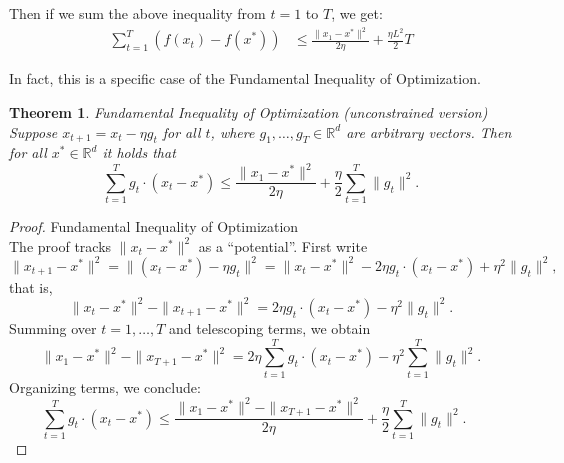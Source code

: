 \documentclass[11pt]{book} %
\newtheorem{theorem}{Theorem}[section]
\begin{document}
Then if we sum the above inequality from $t=1$ to $T$, we get:
\begin{align*}
    \sum_{t=1}^T ( f(x_t) - f(x^*) ) &\leq \frac{\|x_1 - x^*\|^2}{2 \eta} + \frac{\eta L^2}{2} T 
\end{align*}

In fact, this is a specific case of the Fundamental Inequality of Optimization. 

\begin{theorem}{Fundamental Inequality of Optimization (unconstrained version)} \\
    Suppose \( x_{t+1} = x_t - \eta g_t \) for all \( t \), where \( g_1, \ldots, g_T \in \mathbb{R}^d \) are arbitrary vectors. Then for all \( x^* \in \mathbb{R}^d \) it holds that
    \[
    \sum_{t=1}^T g_t \cdot (x_t - x^*) \leq \frac{\|x_1 - x^*\|^2}{2\eta} + \frac{\eta}{2} \sum_{t=1}^T \|g_t\|^2.
    \]
\end{theorem}
    
\begin{proof}{Fundamental Inequality of Optimization} \\
    The proof tracks \( \|x_t - x^*\|^2 \) as a ``potential''. First write
    \[
    \|x_{t+1} - x^*\|^2 = \|(x_t - x^*) - \eta g_t\|^2 = \|x_t - x^*\|^2 - 2\eta g_t \cdot (x_t - x^*) + \eta^2 \|g_t\|^2,
    \]
    that is,
    \[
    \|x_t - x^*\|^2 - \|x_{t+1} - x^*\|^2 = 2\eta g_t \cdot (x_t - x^*) - \eta^2 \|g_t\|^2.
    \]
    Summing over \( t = 1, \ldots, T \) and telescoping terms, we obtain
    \[
    \|x_1 - x^*\|^2 - \|x_{T+1} - x^*\|^2 = 2\eta \sum_{t=1}^T g_t \cdot (x_t - x^*) - \eta^2 \sum_{t=1}^T \|g_t\|^2.
    \]
    Organizing terms, we conclude:
    \[
    \sum_{t=1}^T g_t \cdot (x_t - x^*) \leq \frac{\|x_1 - x^*\|^2 - \|x_{T+1} - x^*\|^2}{2\eta} + \frac{\eta}{2} \sum_{t=1}^T \|g_t\|^2. \quad 
    \]
\end{proof}

\bigbreak


    

\end{document}
